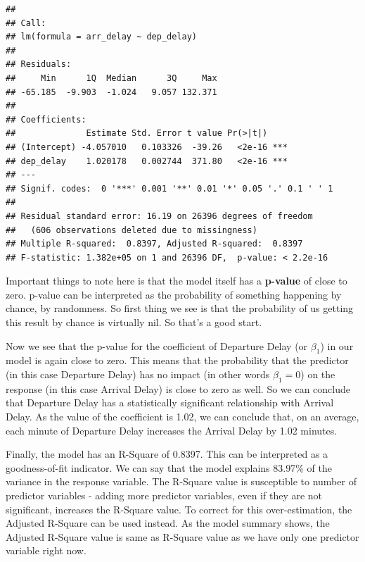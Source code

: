 \documentclass[11pt, letterpaper, twoside]{memoir}\usepackage{knitr}
\begin{document}
\begin{knitrout}
\color{fgcolor}\begin{kframe}
\begin{alltt}
\end{alltt}
\begin{verbatim}
## 
## Call:
## lm(formula = arr_delay ~ dep_delay)
## 
## Residuals:
##     Min      1Q  Median      3Q     Max 
## -65.185  -9.903  -1.024   9.057 132.371 
## 
## Coefficients:
##              Estimate Std. Error t value Pr(>|t|)    
## (Intercept) -4.057010   0.103326  -39.26   <2e-16 ***
## dep_delay    1.020178   0.002744  371.80   <2e-16 ***
## ---
## Signif. codes:  0 '***' 0.001 '**' 0.01 '*' 0.05 '.' 0.1 ' ' 1
## 
## Residual standard error: 16.19 on 26396 degrees of freedom
##   (606 observations deleted due to missingness)
## Multiple R-squared:  0.8397,	Adjusted R-squared:  0.8397 
## F-statistic: 1.382e+05 on 1 and 26396 DF,  p-value: < 2.2e-16
\end{verbatim}
\end{kframe}
\end{knitrout}

Important things to note here is that the model itself has a \textbf{p-value}  of close to zero. p-value can be interpreted as the probability of something happening by chance, by randomness. So first thing we see is that the probability of us getting this result by chance is virtually nil. So that's a good start. 

Now we see that the p-value for the coefficient of Departure Delay (or $\beta_1$) in our model is again close to zero. This means that the probability that the predictor (in this case Departure Delay) has no impact (in other words $\beta_1 = 0$) on the response (in this case Arrival Delay) is close to zero as well. So we can conclude that Departure Delay has a statistically significant relationship with Arrival Delay. As the value of the coefficient is 1.02, we can conclude that, on an average, each minute of Departure Delay increases the Arrival Delay by 1.02 minutes.

Finally, the model has an R-Square of 0.8397. This can be interpreted as a goodness-of-fit indicator. We can say that the model explains 83.97\% of the variance in the response variable. The R-Square value is susceptible to number of predictor variables - adding more predictor variables, even if they are not significant, increases the R-Square value. To correct for this over-estimation, the Adjusted R-Square  can be used instead. As the model summary shows, the Adjusted R-Square value is same as R-Square value as we have only one predictor variable right now.
\end{document}

